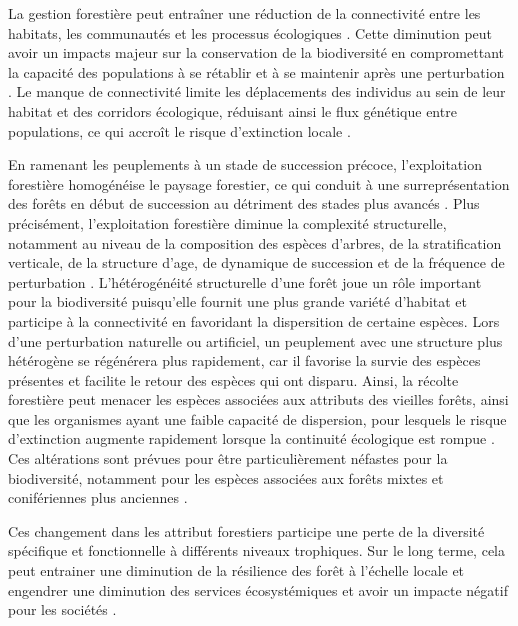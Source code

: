 La gestion forestière peut entraîner une réduction de la connectivité entre les habitats, les communautés et les processus écologiques \citep{Lindenmayer2006Generalmanagement}.
Cette diminution peut avoir un impacts majeur sur la conservation de la biodiversité en compromettant la capacité des populations à se rétablir et à se maintenir après une perturbation \citep{Lamberson1994ReserveDesign}. 
Le manque de connectivité limite les déplacements des individus au sein de leur habitat et des corridors écologique, réduisant ainsi le flux génétique entre populations, ce qui accroît le risque d'extinction locale \citep{Saccheri1998Inbreedingextinction}.

En ramenant les peuplements à un stade de succession précoce, l'exploitation forestière homogénéise le paysage forestier, ce qui conduit à une surreprésentation des forêts en début de succession au détriment des stades plus avancés \citep{Cyr2009Forestmanagement,Boucher2017Cumulativepatterns}. 
Plus précisément, l'exploitation forestière diminue la complexité structurelle, notamment au niveau de la composition des espèces d'arbres, de la stratification verticale, de la structure d'age, de dynamique de succession et de la fréquence de perturbation \citep{Commarmot2005Structurevirgin}. 
L'hétérogénéité structurelle d'une forêt joue un rôle important pour la biodiversité puisqu'elle fournit une plus grande variété d'habitat et participe à la connectivité en favoridant la dispersition de certaine espèces. 
Lors d'une perturbation naturelle ou artificiel, un peuplement avec une structure plus hétérogène se régénérera plus rapidement, car il favorise la survie des espèces présentes et facilite le retour des espèces qui ont disparu. 
Ainsi, la récolte forestière peut menacer les espèces associées aux attributs des vieilles forêts, ainsi que les organismes ayant une faible capacité de dispersion, pour lesquels le risque d'extinction augmente rapidement lorsque la continuité écologique est rompue \citep{Norden2001Conceptualproblems,Martin2021indicatorspecies}.  
Ces altérations sont prévues pour être particulièrement néfastes pour la biodiversité, notamment pour les espèces associées aux forêts mixtes et conifériennes plus anciennes \citep{Tremblay2018Harvestinginteracts,Cadieux2020Projectedeffects}.

Ces changement dans les attribut forestiers participe une perte de la diversité spécifique et fonctionnelle à différents niveaux trophiques. 
Sur le long terme, cela peut entrainer une diminution de la résilience des forêt à l'échelle locale et engendrer une diminution des services écosystémiques et avoir un impacte négatif pour les sociétés \citep{Hooper2012globalsynthesis,Edwards2014Maintainingecosystem}. 

